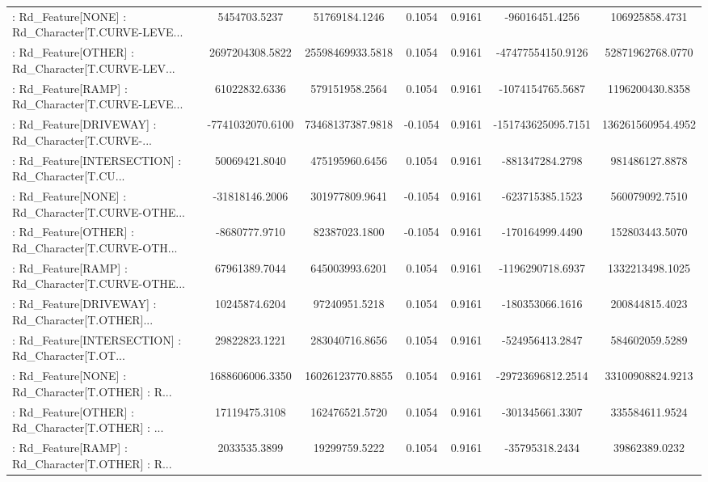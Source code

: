 \begin{longtable}{p{4cm}cccccc}
 : Rd\_Feature[NONE] : Rd\_Character[T.CURVE-LEVE... &      5454703.5237 &     51769184.1246 &  0.1054 &       0.9161 &     -96016451.4256 &    106925858.4731 \\
 : Rd\_Feature[OTHER] : Rd\_Character[T.CURVE-LEV... &   2697204308.5822 &  25598469933.5818 &  0.1054 &       0.9161 &  -47477554150.9126 &  52871962768.0770 \\
 : Rd\_Feature[RAMP] : Rd\_Character[T.CURVE-LEVE... &     61022832.6336 &    579151958.2564 &  0.1054 &       0.9161 &   -1074154765.5687 &   1196200430.8358 \\
 : Rd\_Feature[DRIVEWAY] : Rd\_Character[T.CURVE-... &  -7741032070.6100 &  73468137387.9818 & -0.1054 &       0.9161 & -151743625095.7151 & 136261560954.4952 \\
 : Rd\_Feature[INTERSECTION] : Rd\_Character[T.CU... &     50069421.8040 &    475195960.6456 &  0.1054 &       0.9161 &    -881347284.2798 &    981486127.8878 \\
 : Rd\_Feature[NONE] : Rd\_Character[T.CURVE-OTHE... &    -31818146.2006 &    301977809.9641 & -0.1054 &       0.9161 &    -623715385.1523 &    560079092.7510 \\
 : Rd\_Feature[OTHER] : Rd\_Character[T.CURVE-OTH... &     -8680777.9710 &     82387023.1800 & -0.1054 &       0.9161 &    -170164999.4490 &    152803443.5070 \\
 : Rd\_Feature[RAMP] : Rd\_Character[T.CURVE-OTHE... &     67961389.7044 &    645003993.6201 &  0.1054 &       0.9161 &   -1196290718.6937 &   1332213498.1025 \\
 : Rd\_Feature[DRIVEWAY] : Rd\_Character[T.OTHER]... &     10245874.6204 &     97240951.5218 &  0.1054 &       0.9161 &    -180353066.1616 &    200844815.4023 \\
 : Rd\_Feature[INTERSECTION] : Rd\_Character[T.OT... &     29822823.1221 &    283040716.8656 &  0.1054 &       0.9161 &    -524956413.2847 &    584602059.5289 \\
 : Rd\_Feature[NONE] : Rd\_Character[T.OTHER] : R... &   1688606006.3350 &  16026123770.8855 &  0.1054 &       0.9161 &  -29723696812.2514 &  33100908824.9213 \\
 : Rd\_Feature[OTHER] : Rd\_Character[T.OTHER] : ... &     17119475.3108 &    162476521.5720 &  0.1054 &       0.9161 &    -301345661.3307 &    335584611.9524 \\
 : Rd\_Feature[RAMP] : Rd\_Character[T.OTHER] : R... &      2033535.3899 &     19299759.5222 &  0.1054 &       0.9161 &     -35795318.2434 &     39862389.0232 \\

\end{longtable}
